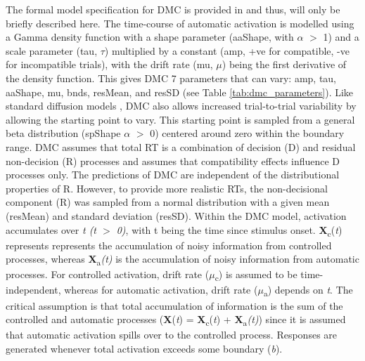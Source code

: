 The formal model specification for DMC is provided in
\textcite{ulrich2015automatic} and thus, will only be briefly described here.
The time-course of automatic activation is modelled using a Gamma density
function with a shape parameter (aaShape, with $\alpha$ $>$ 1) and a scale
parameter (tau, $\tau$) multiplied by a constant (amp, +ve for compatible, -ve
for incompatible trials), with the drift rate (mu, $\mu$) being the first
derivative of the density function. This gives DMC 7 parameters that can vary:
amp, tau, aaShape, mu, bnds, resMean, and resSD (see Table \ref{tab:dmc_parameters}).
Like standard diffusion models \parencite[see][]{ratcliff2013parameter}, DMC
also allows increased trial-to-trial variability by allowing the starting point
to vary. This starting point is sampled from a general beta distribution
(spShape $\alpha$ $>$ 0) centered around zero within the boundary range. DMC
assumes that total RT is a combination of decision (D) and residual
non-decision (R) processes and assumes that compatibility effects influence D
processes only. The predictions of DMC are independent of the distributional
properties of R. However, to provide more realistic RTs, the non-decisional
component (R) was sampled from a normal distribution with a given mean
(resMean) and standard deviation (resSD). Within the DMC model, activation
accumulates over \textit{t (t $>$ 0)}, with t being the time since stimulus
onset. \textbf{X}\textsubscript{c}(\textit{t}) represents represents the
accumulation of noisy information from controlled processes, whereas
\textbf{X}\textsubscript{a}\textit{(t)} is the accumulation of noisy
information from automatic processes. For controlled activation, drift rate
(\textit{$\mu$}\textsubscript{c}) is assumed to be time-independent, whereas
for automatic activation, drift rate (\textit{$\mu$}\textsubscript{a}) depends
on \textit{t}. The critical assumption is that total accumulation of
information is the sum of the controlled and automatic processes
(\textbf{X}(\textit{t}) = \textbf{X}\textsubscript{c}(\textit{t}) +
\textbf{X}\textsubscript{a}\textit{(t)}) since it is assumed that automatic
activation spills over to the controlled process. Responses are generated
whenever total activation exceeds some boundary (\textit{b}). 

